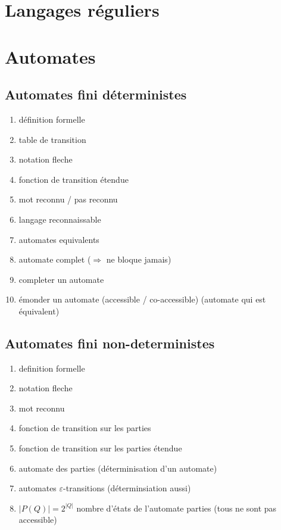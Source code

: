 \section{Langages réguliers}

\section{Automates}
\subsection{Automates fini déterministes}

\begin{enumerate}
    \item définition formelle
    \item table de transition
    \item notation fleche
    \item fonction de transition étendue
    \item mot reconnu / pas reconnu
    \item langage reconnaissable
    \item automates equivalents
    \item automate complet ($\Rightarrow$ ne bloque jamais)
    \item completer un automate
    \item émonder un automate (accessible / co-accessible) (automate qui est équivalent)
\end{enumerate}

\subsection{Automates fini non-deterministes}

\begin{enumerate}
    \item definition formelle
    \item notation fleche
    \item mot reconnu
    \item fonction de transition sur les parties
    \item fonction de transition sur les parties étendue
    \item automate des parties (déterminisation d'un automate)
    \item automates $\varepsilon$-transitions (déterminsiation aussi)
    \item $|P(Q)| = 2^{|Q|}$ nombre d'états de l'automate parties (tous ne sont pas accessible)
\end{enumerate}


